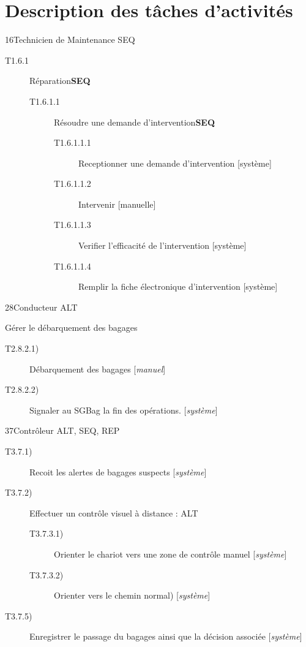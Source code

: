 \part{Description des tâches d'activités}
{1}{6}{Technicien de Maintenance}
{SEQ}
{
\begin{description}
	\item[T1.6.1] Réparation\textbf{SEQ}
	\begin{description}
		\item[T1.6.1.1] Résoudre une demande d'intervention\textbf{SEQ}
		\begin{description}
			\item[T1.6.1.1.1] Receptionner une demande d'intervention [système]
			\item[T1.6.1.1.2] Intervenir [manuelle]
			\item[T1.6.1.1.3] Verifier l'efficacité de l'intervention [système]
			\item[T1.6.1.1.4] Remplir la fiche électronique d'intervention [système]
		\end{description}
	\end{description}
\end{description}
}

\dta
{2}{8}{Conducteur}
{ALT}
{

	\item [T2.8.2)] Gérer le débarquement des bagages
		\begin{description}
			\item [T2.8.2.1)] Débarquement des bagages [\textsl{manuel}]
			\item [T2.8.2.2)] Signaler au SGBag la fin des opérations. [\textsl{système}]
		\end{description}
}

\dta
{3}{7}{Contrôleur}
{ALT, SEQ, REP}
{
\begin{description}
	\item [T3.7.1)] Recoit les alertes de bagages suspects [\textsl{système}]
	\item [T3.7.2)] Effectuer un contrôle visuel à distance : ALT
	\begin{description}
		\item [T3.7.3.1)] Orienter le chariot vers une zone de contrôle manuel [\textsl{système}]
		\item [T3.7.3.2)] Orienter vers le chemin \og normal\fg) [\textsl{système}]
	\end{description}
	\item [T3.7.5)] Enregistrer le passage du bagages ainsi que la décision associée [\textsl{système}]
\end{description}
}

